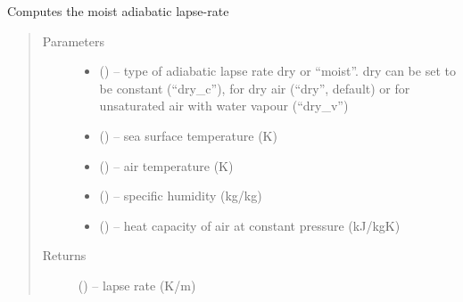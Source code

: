 \documentclass[letterpaper,10pt,english]{sphinxmanual}
\begin{document}
\begin{fulllineitems}
\label{\detokenize{index:hum_subs.gamma}}
Computes the moist adiabatic lapse-rate
\begin{quote}\begin{description}
\item[{Parameters}] \leavevmode\begin{itemize}
\item {} 
 (\href{https://docs.python.org/3/library/functions.html\#str}{}) -- type of adiabatic lapse rate dry or ``moist''. dry can be set to be constant (``dry\_c''), for dry air (``dry'', default) or for unsaturated air with water vapour (``dry\_v'') 

\item {} 
 (\href{https://docs.python.org/3/library/functions.html\#float}{}) -- sea surface temperature (K)

\item {} 
 (\href{https://docs.python.org/3/library/functions.html\#float}{}) -- air temperature (K)

\item {} 
 (\href{https://docs.python.org/3/library/functions.html\#float}{}) -- specific humidity (kg/kg)

\item {} 
 (\href{https://docs.python.org/3/library/functions.html\#float}{}) -- heat capacity of air at constant pressure (kJ/kgK)

\end{itemize}

\item[{Returns}] \leavevmode
{} (\href{https://docs.python.org/3/library/functions.html\#float}{}) -- lapse rate (K/m)

\end{description}\end{quote}

\end{fulllineitems}



 

\end{document}
